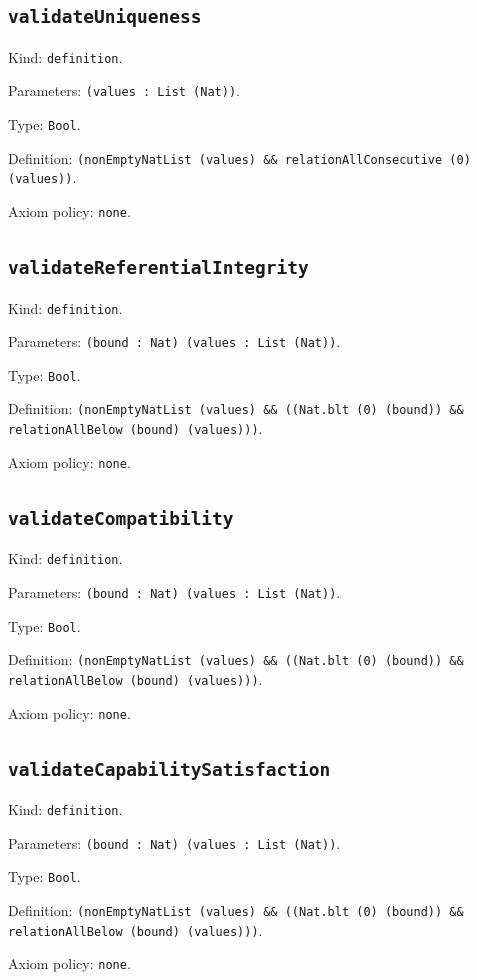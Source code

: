 \documentclass[11pt]{article}
\begin{document}
\subsection*{\texttt{validateUniqueness}}
\noindent Kind: \texttt{definition}.\par
\noindent Parameters: \texttt{(values : List (Nat))}.\par
\noindent Type: \texttt{Bool}.\par
\noindent Definition: \texttt{(nonEmptyNatList (values) \&\& relationAllConsecutive (0) (values))}.\par
\noindent Axiom policy: \texttt{none}.\par
\subsection*{\texttt{validateReferentialIntegrity}}
\noindent Kind: \texttt{definition}.\par
\noindent Parameters: \texttt{(bound : Nat) (values : List (Nat))}.\par
\noindent Type: \texttt{Bool}.\par
\noindent Definition: \texttt{(nonEmptyNatList (values) \&\& ((Nat.blt (0) (bound)) \&\& relationAllBelow (bound) (values)))}.\par
\noindent Axiom policy: \texttt{none}.\par
\subsection*{\texttt{validateCompatibility}}
\noindent Kind: \texttt{definition}.\par
\noindent Parameters: \texttt{(bound : Nat) (values : List (Nat))}.\par
\noindent Type: \texttt{Bool}.\par
\noindent Definition: \texttt{(nonEmptyNatList (values) \&\& ((Nat.blt (0) (bound)) \&\& relationAllBelow (bound) (values)))}.\par
\noindent Axiom policy: \texttt{none}.\par
\subsection*{\texttt{validateCapabilitySatisfaction}}
\noindent Kind: \texttt{definition}.\par
\noindent Parameters: \texttt{(bound : Nat) (values : List (Nat))}.\par
\noindent Type: \texttt{Bool}.\par
\noindent Definition: \texttt{(nonEmptyNatList (values) \&\& ((Nat.blt (0) (bound)) \&\& relationAllBelow (bound) (values)))}.\par
\noindent Axiom policy: \texttt{none}.\par
\end{document}
